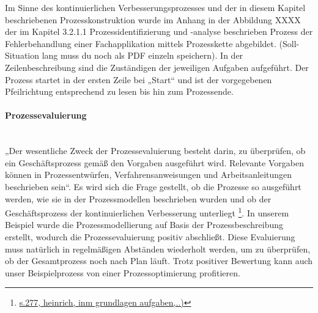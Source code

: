 Im Sinne des kontinuierlichen Verbesserungsprozesses und der in diesem Kapitel beschriebenen Prozesskonstruktion wurde im Anhang in der Abbildung XXXX der im Kapitel 3.2.1.1 Prozessidentifizierung und -analyse beschrieben Prozess der Fehlerbehandlung einer Fachapplikation mittels Prozesskette abgebildet. (Soll-Situation lang muss du noch als PDF einzeln speichern). In der Zeilenbeschreibung sind die Zuständigen der jeweiligen Aufgaben aufgeführt. Der Prozess startet in der ersten Zeile bei „Start“ und ist der vorgegebenen Pfeilrichtung entsprechend zu lesen bis hin zum Prozessende.

\paragraph{Prozessevaluierung}\mbox{}\\
„Der wesentliche Zweck der Prozessevaluierung besteht darin, zu überprüfen, ob ein Geschäftsprozess gemäß den Vorgaben ausgeführt wird. Relevante Vorgaben können in Prozessentwürfen, Verfahrensanweisungen und Arbeitsanleitungen  beschrieben sein“. Es wird sich die Frage gestellt, ob die Prozesse so ausgeführt werden, wie sie in der Prozessmodellen beschrieben wurden und ob der Geschäftsprozess der kontinuierlichen Verbesserung unterliegt \footnote{\url{s.277, heinrich, inm grundlagen aufgaben,..)}}. In unserem Beispiel wurde die Prozessmodellierung auf Basis der Prozessbeschreibung erstellt, wodurch die Prozessevaluierung positiv abschließt. Diese Evaluierung muss natürlich in regelmäßigen Abständen wiederholt werden, um zu überprüfen, ob der Gesamtprozess noch nach Plan läuft. Trotz positiver Bewertung kann auch unser Beispielprozess von einer Prozessoptimierung profitieren.

